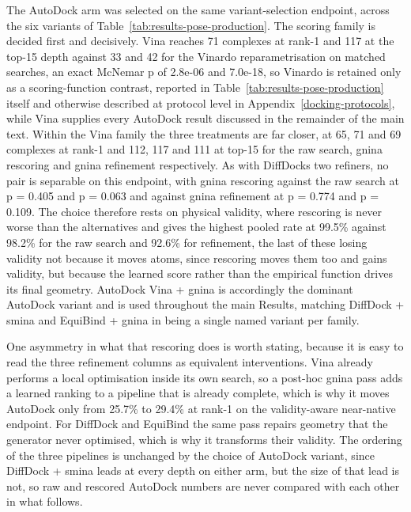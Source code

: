 The AutoDock arm was selected on the same variant-selection endpoint, across the six variants of Table~\ref{tab:results-pose-production}. The scoring family is decided first and decisively. Vina reaches 71 complexes at rank-1 and 117 at the top-15 depth against 33 and 42 for the Vinardo reparametrisation on matched searches, an exact McNemar p of 2.8e-06 and 7.0e-18, so Vinardo is retained only as a scoring-function contrast, reported in Table~\ref{tab:results-pose-production} itself and otherwise described at protocol level in Appendix~\ref{docking-protocols}, while Vina supplies every AutoDock result discussed in the remainder of the main text. Within the Vina family the three treatments are far closer, at 65, 71 and 69 complexes at rank-1 and 112, 117 and 111 at top-15 for the raw search, gnina rescoring and gnina refinement respectively. As with DiffDock\textquotesingle s two refiners, no pair is separable on this endpoint, with gnina rescoring against the raw search at p = 0.405 and p = 0.063 and against gnina refinement at p = 0.774 and p = 0.109. The choice therefore rests on physical validity, where rescoring is never worse than the alternatives and gives the highest pooled rate at 99.5\% against 98.2\% for the raw search and 92.6\% for refinement, the last of these losing validity not because it moves atoms, since rescoring moves them too and gains validity, but because the learned score rather than the empirical function drives its final geometry. AutoDock Vina + gnina is accordingly the dominant AutoDock variant and is used throughout the main Results, matching DiffDock + smina and EquiBind + gnina in being a single named variant per family.

One asymmetry in what that rescoring does is worth stating, because it is easy to read the three refinement columns as equivalent interventions. Vina already performs a local optimisation inside its own search, so a post-hoc gnina pass adds a learned ranking to a pipeline that is already complete, which is why it moves AutoDock only from 25.7\% to 29.4\% at rank-1 on the validity-aware near-native endpoint. For DiffDock and EquiBind the same pass repairs geometry that the generator never optimised, which is why it transforms their validity. The ordering of the three pipelines is unchanged by the choice of AutoDock variant, since DiffDock + smina leads at every depth on either arm, but the size of that lead is not, so raw and rescored AutoDock numbers are never compared with each other in what follows.

